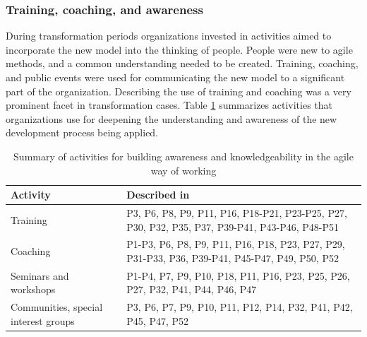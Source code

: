 \subsubsection{Training, coaching, and awareness}

During transformation periods organizations invested in activities aimed to
incorporate the new model into the thinking of people. People were new to agile
methods, and a common understanding needed to be created. Training, coaching,
and public events were used for communicating the new model to a significant
part of the organization. Describing the use of training and coaching was a very
prominent facet in transformation cases.
Table \ref{table:transformation_training} summarizes activities that
organizations use for deepening the understanding and awareness of the new
development process being applied.

\begin{table}[h]
    \centering
    \begin{tabular}{ >{\raggedright\arraybackslash}p{}
                     >{\raggedright\arraybackslash}p{} }
        \toprule
        Activity           &  Described in  \\
        \midrule
        Training    &
                P3, P6, P8, P9, P11, P16, P18-P21, P23-P25, P27, P30,
                P32, P35, P37, P39-P41, P43-P46, P48-P51  \\  %
        Coaching    &
                P1-P3, P6, P8, P9, P11, P16, P18, P23, P27, P29,
                P31-P33, P36, P39-P41, P45-P47, P49, P50, P52  \\  %
        Seminars and workshops   &
                P1-P4, P7, P9, P10, P18, P11, P16, P23, P25,
                P26, P27, P32, P41, P44, P46, P47   \\   %
        Communities, special interest groups  &
                P3, P6, P7, P9, P10, P11, P12, P14, P32, P41,
                P42, P45, P47, P52  \\   %
        \bottomrule
    \end{tabular}
    \caption{Summary of activities for building awareness and knowledgeability
             in the agile way of working}
    \label{table:transformation_training}
\end{table}


